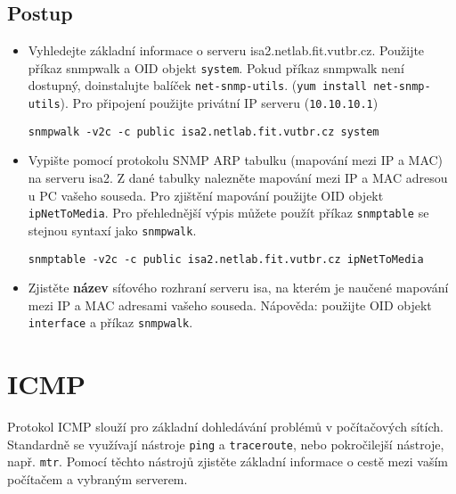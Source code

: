 \subsection*{Postup}
\begin{itemize}
    \item Vyhledejte základní informace o serveru isa2.netlab.fit.vutbr.cz.  Použijte příkaz snmpwalk a OID objekt \texttt{system}. Pokud příkaz snmpwalk není dostupný, doinstalujte balíček \texttt{net-snmp-utils}. (\texttt{yum install net-snmp-utils}). Pro připojení použijte privátní IP serveru (\texttt{10.10.10.1})
      \begin{verbatim}snmpwalk -v2c -c public isa2.netlab.fit.vutbr.cz system\end{verbatim}
    \item Vypište pomocí protokolu SNMP ARP tabulku (mapování mezi IP a MAC) na serveru isa2. Z dané tabulky nalezněte mapování mezi IP a MAC adresou u PC vašeho souseda. Pro zjištění mapování použijte OID objekt \texttt{ipNetToMedia}. Pro přehlednější výpis můžete použít příkaz \texttt{snmptable} se stejnou syntaxí jako \texttt{snmpwalk}.
    \begin{verbatim}snmptable -v2c -c public isa2.netlab.fit.vutbr.cz ipNetToMedia
    \end{verbatim}
    \item Zjistěte \textbf{název} síťového rozhraní serveru isa, na kterém je naučené mapování mezi IP a MAC adresami vašeho souseda. Nápověda: použijte OID objekt \texttt{interface} a příkaz \texttt{snmpwalk}.
\end{itemize}

\section{ICMP}
Protokol ICMP slouží pro základní dohledávání problémů v počítačových sítích. Standardně se využívají nástroje \texttt{ping} a \texttt{traceroute}, nebo pokročilejší nástroje, např. \texttt{mtr}. Pomocí těchto nástrojů zjistěte základní informace o cestě mezi vaším počítačem a vybraným serverem.

